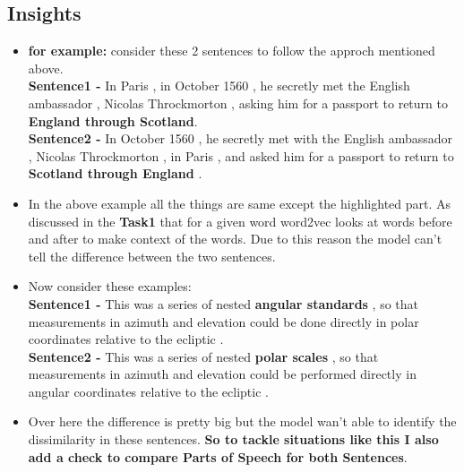 \documentclass{article}
\begin{document}
\subsection{Insights}
\begin{itemize}
    \item \textbf{for example:} consider these 2 sentences{\cite{paws2019naacl}} to follow the approch mentioned above.\\
    \textbf{Sentence1 -} In Paris , in October 1560 , he secretly met the English ambassador , Nicolas Throckmorton , asking him for a passport to return to \textbf{England through Scotland}.\\
    \textbf{Sentence2 -} In October 1560 , he secretly met with the English ambassador , Nicolas Throckmorton , in Paris , and asked him for a passport to return to \textbf{Scotland through England} .

    \item In the above example all the things are same except the highlighted part. As discussed in the \textbf{Task1} that for a given word word2vec looks at words before and after to make context of the words. Due to this reason the model can't tell the difference between the two sentences.
    
    \item Now consider these examples{\cite{paws2019naacl}}:\\
    \textbf{Sentence1 -} This was a series of nested \textbf{angular standards} , so that measurements in azimuth and elevation could be done directly in polar coordinates relative to the ecliptic .\\
    \textbf{Sentence2 -} This was a series of nested \textbf{polar scales} , so that measurements in azimuth and elevation could be performed directly in angular coordinates relative to the ecliptic .\\

    \item Over here the difference is pretty big but the model wan't able to identify the dissimilarity in these sentences. \textbf{So to tackle situations like this I also add a check to compare Parts of Speech for both Sentences}. 
    
\end{itemize}
\end{document}
